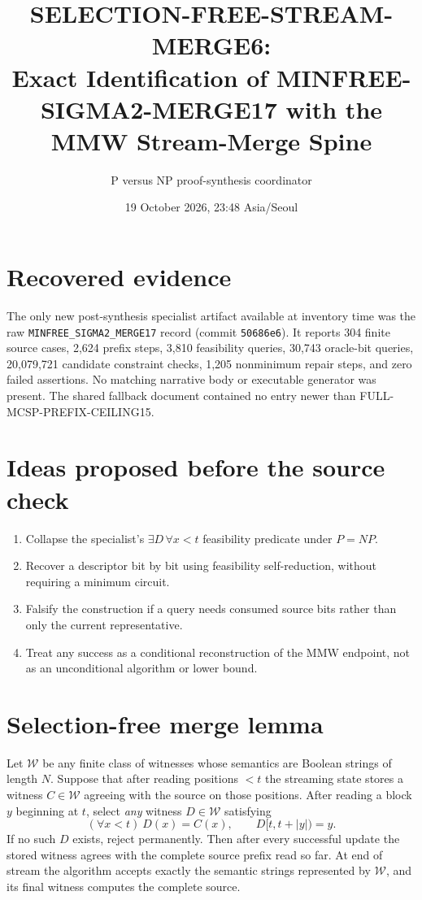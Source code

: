 \documentclass[11pt]{article}
\title{SELECTION-FREE-STREAM-MERGE6:\\Exact Identification of MINFREE-SIGMA2-MERGE17 with the MMW Stream-Merge Spine}
\author{P versus NP proof-synthesis coordinator}
\date{19 October 2026, 23:48 Asia/Seoul}
\begin{document}
\maketitle

\begin{center}
\end{center}

\section*{Recovered evidence}
The only new post-synthesis specialist artifact available at inventory time was the raw
\texttt{MINFREE\_SIGMA2\_MERGE17} record
(commit \texttt{50686e6}).  It reports 304 finite source cases, 2,624 prefix steps, 3,810 feasibility queries, 30,743 oracle-bit queries, 20,079,721 candidate constraint checks, 1,205 nonminimum repair steps, and zero failed assertions.  No matching narrative body or executable generator was present.  The shared fallback document contained no entry newer than FULL-MCSP-PREFIX-CEILING15.

\section*{Ideas proposed before the source check}
\begin{enumerate}
\item Collapse the specialist's $\exists D\,\forall x<t$ feasibility predicate under $P=NP$.
\item Recover a descriptor bit by bit using feasibility self-reduction, without requiring a minimum circuit.
\item Falsify the construction if a query needs consumed source bits rather than only the current representative.
\item Treat any success as a conditional reconstruction of the MMW endpoint, not as an unconditional algorithm or lower bound.
\end{enumerate}

\section*{Selection-free merge lemma}
Let $\mathcal W$ be any finite class of witnesses whose semantics are Boolean strings of length $N$.
Suppose that after reading positions $<t$ the streaming state stores a witness $C\in\mathcal W$ agreeing with the source on those positions.  After reading a block $y$ beginning at $t$, select \emph{any} witness $D\in\mathcal W$ satisfying
\[
  (\forall x<t)\ D(x)=C(x),\qquad D[t,t+|y|)=y.
\]
If no such $D$ exists, reject permanently.  Then after every successful update the stored witness agrees with the complete source prefix read so far.  At end of stream the algorithm accepts exactly the semantic strings represented by $\mathcal W$, and its final witness computes the complete source.
\end{document}
